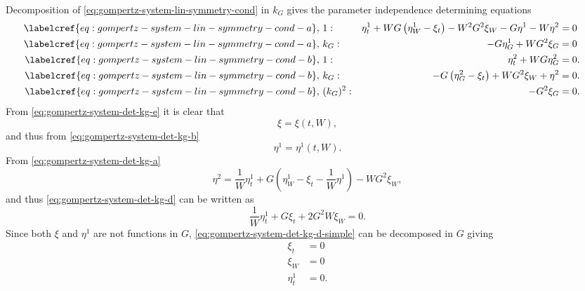 Decomposition of \cref{eq:gompertz-system-lin-symmetry-cond} in \(k_G\) gives the parameter independence determining equations
\begin{subequations}
  \begin{flalign}
    \labelcref{eq:gompertz-system-lin-symmetry-cond-a},\ & 1 : & \eta^1_t + W G \left(\eta^1_W - \xi_t\right) - W^2 G^2 \xi_W - G \eta^1 - W \eta^2 &= 0 && \FlLabel{eq:gompertz-system-det-kg-a}\\
    \labelcref{eq:gompertz-system-lin-symmetry-cond-a},\ & k_G : & - G \eta^1_G + W G^2 \xi_G &= 0 && \FlLabel{eq:gompertz-system-det-kg-b}\\
    \labelcref{eq:gompertz-system-lin-symmetry-cond-b},\ & 1 : & \eta^2_t + W G \eta^2_G &= 0. && \FlLabel{eq:gompertz-system-det-kg-c} \\
    \labelcref{eq:gompertz-system-lin-symmetry-cond-b},\ & k_G : & - G \left(\eta^2_G - \xi_t\right) + W G^2 \xi_W + \eta^2 &= 0. && \FlLabel{eq:gompertz-system-det-kg-d} \\
    \labelcref{eq:gompertz-system-lin-symmetry-cond-b},\ & (k_G)^2 : & - G^2 \xi_G &= 0. && \FlLabel{eq:gompertz-system-det-kg-e}
  \end{flalign}
\end{subequations}
From \cref{eq:gompertz-system-det-kg-e} it is clear that
\begin{equation} \label{eq:system-gompertz-kG-first-simplification-1}
  \xi = \xi(t, W),
\end{equation}
and thus from \cref{eq:gompertz-system-det-kg-b}
\begin{equation} \label{eq:system-gompertz-kG-first-simplification-2}
  \eta^1 = \eta^1(t, W).
\end{equation}
From \cref{eq:gompertz-system-det-kg-a}
\begin{equation}
  \eta^2 = \frac{1}{W}\eta^1_t + G \left(\eta^1_W - \xi_t - \frac{1}{W} \eta^1 \right) - W G^2 \xi_W,
\end{equation}
and thus \cref{eq:gompertz-system-det-kg-d} can be written as
\begin{equation}\label{eq:gompertz-system-det-kg-d-simple}
  \frac{1}{W}\eta^1_t + G \xi_t + 2 G^2 W \xi_W = 0.
\end{equation}
Since both \(\xi\) and \(\eta^1\) are not functions in \(G\), \cref{eq:gompertz-system-det-kg-d-simple} can be decomposed in \(G\) giving
\begin{align}
  \xi_t &= 0\\
  \xi_W &= 0\\
  \eta^1_t &= 0.
\end{align}
